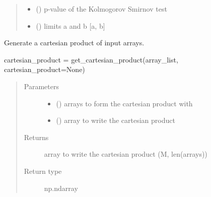 \documentclass[letterpaper,10pt,english,openany,oneside]{sphinxmanual}
\begin{document}
\begin{fulllineitems}
\begin{quote}
\begin{description}
\begin{itemize}
\item {} 
 () \textendash{} p-value of the Kolmogorov Smirnov test

\item {} 
 () \textendash{} limits a and b
{[}a, b{]}

\end{itemize}


\end{description}\end{quote}

\end{fulllineitems}


\begin{fulllineitems}
\label{\detokenize{pygpc:pygpc.misc.get_cartesian_product}}
Generate a cartesian product of input arrays.

cartesian\_product = get\_cartesian\_product(array\_list, cartesian\_product=None)
\begin{quote}\begin{description}
\item[{Parameters}] \leavevmode\begin{itemize}
\item {} 
 () \textendash{} arrays to form the cartesian product with

\item {} 
 () \textendash{} array to write the cartesian product

\end{itemize}

\item[{Returns}] \leavevmode
{} \textendash{} array to write the cartesian product
(M, len(arrays))

\item[{Return type}] \leavevmode
np.ndarray

\end{description}\end{quote}

\end{fulllineitems}
\end{document}
